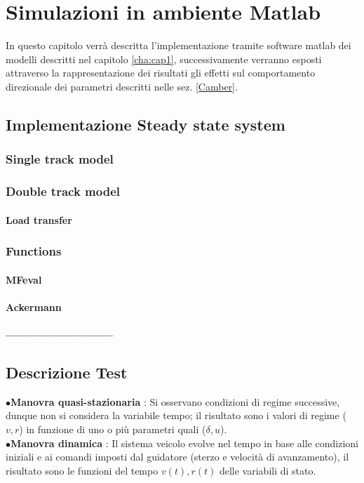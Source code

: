 \chapter{Simulazioni in ambiente Matlab}
\label{cha:cap3}
In questo capitolo verrà descritta l'implementazione tramite software matlab dei modelli descritti nel capitolo \ref{cha:cap1}, successivamente verranno esposti attraverso la rappresentazione dei risultati gli effetti sul comportamento direzionale dei parametri descritti nelle sez. \ref{Camber}.
\section{Implementazione Steady state system}

\subsection{Single track model}

\subsection{Double track model}
\subsubsection{Load transfer}

\subsection{Functions}

\subsubsection{MFeval}
\subsubsection{Ackermann}
\subsubsection{-----------------------------}

\section{Descrizione Test}
$\bullet$\textbf{Manovra quasi-stazionaria} : Si osservano condizioni di regime successive, dunque non si considera la variabile tempo; 
il risultato sono i valori di regime ($v,r$) in funzione di uno o più parametri quali ($\delta,u$).\\
$\bullet$\textbf{Manovra dinamica} : Il sistema veicolo evolve nel tempo in base alle condizioni iniziali e ai comandi imposti dal guidatore (sterzo e velocità di avanzamento), 
il risultato sono le funzioni del tempo $v(t),r(t)$ delle variabili di stato.\\


